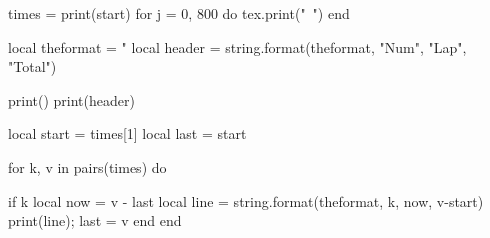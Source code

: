 \documentclass[a4paper]{article}
\begin{document}
\begin{luacode*}

  times = {}
  print(start)
  for j = 0, 800 do
     tex.print("\ ")
  end

\end{luacode*}


\begin{luacode}

  local theformat = "%
  local header = string.format(theformat, "Num", "Lap", "Total")

  print()
  print(header)

  local start = times[1]
  local last = start

  for k, v in pairs(times) do

  if k %
     local now = v - last
     local line = string.format(theformat, k, now, v-start)
     print(line); last = v
  end
  end

\end{luacode}
\end{document}
